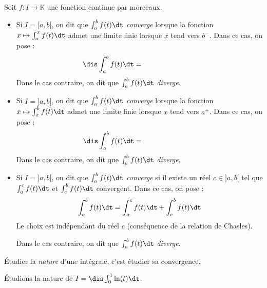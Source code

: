 \documentclass[a4paper,10pt]{report}
\begin{document}
\begin{defin} Soit $f : I \rightarrow \mathbb{K}$ une fonction continue par morceaux.

\begin{itemize}
\item Si $I=[a,b[$, on dit que $\int_a^b f(t)\dt$ \textit{converge} lorsque la fonction $x \mapsto \int_a^x f(t) \dt$ admet une limite finie lorsque $x$ tend vers $b^{-}$. Dans ce cas, on pose :
\[ \dis \int_a^b f(t) \dt = \phantom{\lim_{x\to b^{-}} \int_a^x f(t)\dt} \]
Dans le cas contraire, on dit que $\int_a^b f(t)\dt$ \textit{diverge}.
\item Si $I=]a,b]$, on dit que $\int_a^b f(t)\dt$ \textit{converge} lorsque la fonction $x \mapsto \int_x^b f(t) \dt$ admet une limite finie lorsque $x$ tend vers $a^+$. Dans ce cas, on pose :
\[ \dis \int_a^b f(t) \dt = \phantom{\lim_{x\to a^+} \int_x^b f(t)\dt} \]
Dans le cas contraire, on dit que $\int_a^b f(t)\dt$ \textit{diverge}.
\item Si $I=]a,b[$, on dit que $\int_a^b f(t)\dt$ \textit{converge} si il existe un réel $c \in ]a,b[$ tel que $\int_a^c f(t)\dt$ et $\int_c^b f(t)\dt$ convergent. Dans ce cas, on pose :
$$ \int_a^b f(t)\dt = \int_a^c f(t)\dt + \int_c^b f(t)\dt $$
Le choix est indépendant du réel $c$ (conséquence de la relation de Chasles).

\noindent Dans le cas contraire, on dit que $\int_a^b f(t)\dt$ \textit{diverge}.
\end{itemize}
\end{defin}

\begin{rem}
Étudier la \textit{nature} d'une intégrale, c'est étudier sa convergence.
\end{rem}

\begin{ex} Étudions la nature de $I=\dis \int_{0}^1 \ln(t) \dt$.


\vspace{5cm}
\end{ex}
\end{document}
